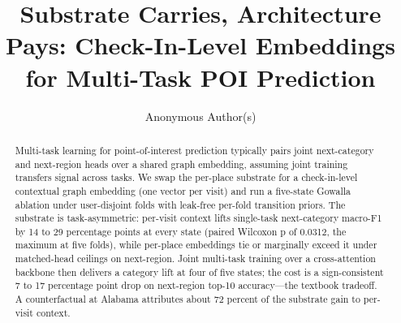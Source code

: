 \documentclass[runningheads]{llncs}
\begin{document}
\title{Substrate Carries, Architecture Pays: Check-In-Level Embeddings for
Multi-Task POI Prediction}


\author{Anonymous Author(s)}

\maketitle

\begin{abstract}
Multi-task learning for point-of-interest prediction typically pairs joint
next-category and next-region heads over a shared graph embedding,
assuming joint training transfers signal across tasks. We swap the
per-place substrate for a check-in-level contextual graph embedding (one
vector per visit) and run a five-state Gowalla ablation under
user-disjoint folds with leak-free per-fold transition priors. The
substrate is task-asymmetric: per-visit context lifts single-task
next-category macro-F1 by 14 to 29 percentage points at every state
(paired Wilcoxon p of 0.0312, the maximum at five folds), while per-place
embeddings tie or marginally exceed it under matched-head ceilings on
next-region. Joint multi-task training over a cross-attention backbone
then delivers a category lift at four of five states; the cost
is a sign-consistent 7 to 17 percentage point drop on next-region top-10
accuracy---the textbook tradeoff. A counterfactual at Alabama attributes
about 72 percent of the substrate gain to per-visit context.

\end{abstract}
\end{document}
